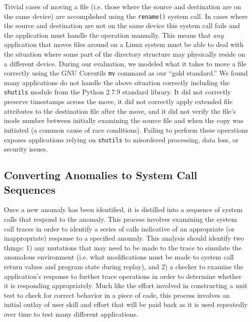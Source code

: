 Trivial cases of moving a file (i.e. those where the source and destination
are on the same device) are accomplished using the {\tt rename()} system
call.  In cases where the source and destination are not on the same device
this system call fails and the application must handle the operation
manually. This means that \emph{any} application that moves files around on
a Linux system must be able to deal with the situation where some part of
the directory structure may physically reside on a different device.
During our evaluation, we modeled what it takes to move a file correctly
using the GNU Coreutils {\tt mv} command as our ``gold standard.''  We
found many applications do not handle the above situation correctly
including the {\tt shutils} module from the Python 2.7.9 standard library.
It did not correctly preserve timestamps across the move, it did not
correctly apply extended file attributes to the destination file after the
move, and it did not verify the file's inode number between initially
examining the source file and when the copy was initiated (a common cause
of race conditions).  Failing to perform these operations exposes
applications relying on {\tt shutils} to misordered processing, data loss,
or security issues.

\subsection{Converting Anomalies to System Call Sequences}

Once a new anomaly has been identified, it is distilled into a sequence of
system calls that respond to the anomaly.  This process involves examining
the system call traces in order to identify a series of calls indicative of
an appropriate (or inappropriate) response to a specified anomaly.  This
analysis should identify two things: 1) any mutations that may need to be
made to the trace to simulate the anomalous environment (i.e. what
modifications must be made to system call return values and program state
during replay), and 2) a checker to examine the application's response to
further trace operations in order to determine whether it is responding
appropriately.  Much like the effort involved in constructing a unit test
to check for correct behavior in a piece of code, this process involves an
initial outlay of user skill and effort that will be paid back as it is
used repeatedly over time to test many different applications.

